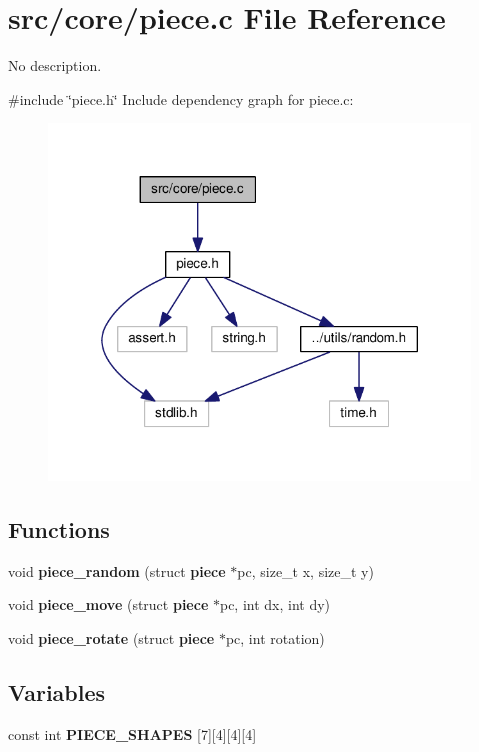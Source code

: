 \section{src/core/piece.c File Reference}
\label{piece_8c}


No description.  


{\ttfamily \#include \char`\"{}piece.\+h\char`\"{}}\newline
Include dependency graph for piece.\+c\+:
\nopagebreak
\begin{figure}[H]
\begin{center}
\leavevmode
\includegraphics[width=317pt]{piece_8c__incl}
\end{center}
\end{figure}
\subsection*{Functions}
\begin{DoxyCompactItemize}
\item 
void \textbf{ piece\+\_\+random} (struct \textbf{ piece} $\ast$pc, size\+\_\+t x, size\+\_\+t y)
\item 
void \textbf{ piece\+\_\+move} (struct \textbf{ piece} $\ast$pc, int dx, int dy)
\item 
void \textbf{ piece\+\_\+rotate} (struct \textbf{ piece} $\ast$pc, int rotation)
\end{DoxyCompactItemize}
\subsection*{Variables}
\begin{DoxyCompactItemize}
\item 
const int \textbf{ P\+I\+E\+C\+E\+\_\+\+S\+H\+A\+P\+ES} [7][4][4][4]
\end{DoxyCompactItemize}


